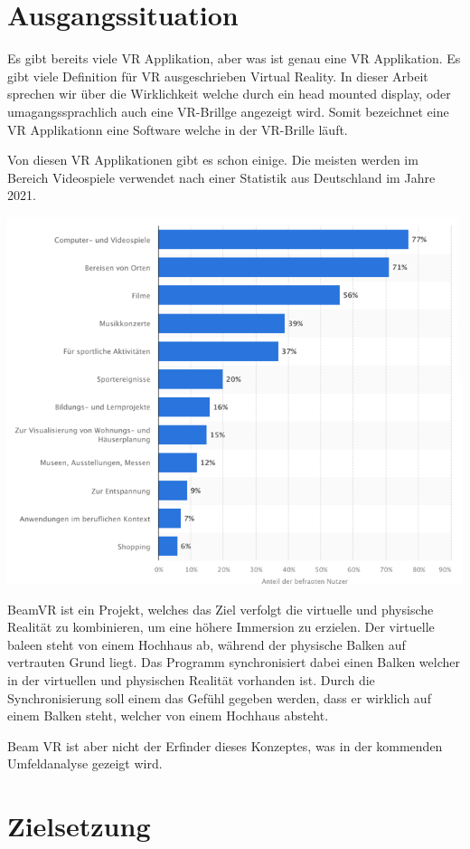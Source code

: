 \section{Ausgangssituation}\label{sec:introduction}

Es gibt bereits viele VR Applikation, aber was ist genau eine VR Applikation.
Es gibt viele Definition für VR ausgeschrieben Virtual Reality.
In dieser Arbeit sprechen wir über die Wirklichkeit welche durch ein head mounted display, oder umagangssprachlich auch eine VR-Brillge angezeigt wird.
Somit bezeichnet eine VR Applikationn eine Software welche in der VR-Brille läuft.

Von diesen VR Applikationen gibt es schon einige.
Die meisten werden im Bereich Videospiele verwendet nach einer Statistik aus Deutschland im Jahre 2021.

\includegraphics[scale=0.5]{pics/statistic_anwendungsgebiete_vr}



BeamVR ist ein Projekt, welches das Ziel verfolgt die virtuelle und physische Realität zu kombinieren,
um eine höhere Immersion zu erzielen.
Der virtuelle baleen steht von einem Hochhaus ab, während der physische Balken auf vertrauten Grund liegt.
Das Programm synchronisiert dabei einen Balken welcher in der virtuellen und physischen Realität vorhanden ist.
Durch die Synchronisierung soll einem das Gefühl gegeben werden, dass er wirklich auf einem Balken steht, welcher von
einem Hochhaus absteht.

Beam VR ist aber nicht der Erfinder dieses Konzeptes, was in der kommenden Umfeldanalyse gezeigt wird.

\section{Zielsetzung}\label{sec:objective}
